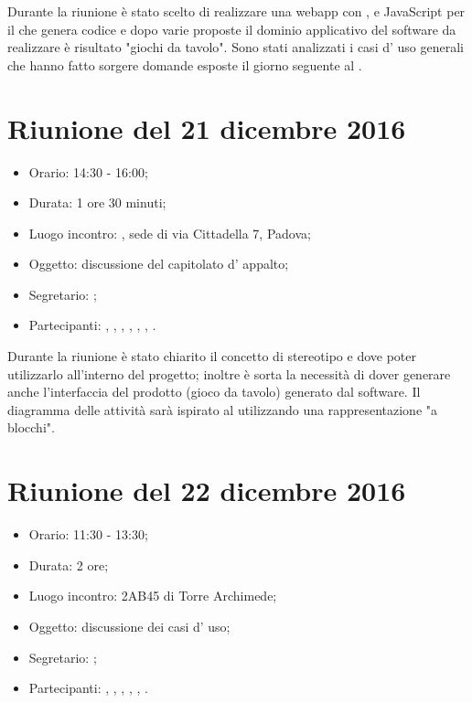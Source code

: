 Durante la riunione è stato scelto di realizzare una webapp con , e JavaScript per il  che genera codice  e dopo varie proposte il dominio applicativo del software da realizzare è risultato "giochi da tavolo". 
Sono stati analizzati i casi d' uso generali che hanno fatto sorgere domande esposte il giorno seguente al \GP.



\section{Riunione del 21 dicembre 2016}

\begin{itemize}
	\item Orario: 14:30 - 16:00;
	\item Durata: 1 ore 30 minuti;
	\item Luogo incontro: \ZU, sede di via Cittadella 7, Padova; 
	\item Oggetto: discussione del capitolato d' appalto;
	\item Segretario: \AZ; 
	\item Partecipanti: \GP, \AZ, \GG, \LB, \LS, \MM, \PB.
\end{itemize}

Durante la riunione è stato chiarito il concetto di stereotipo e dove poter utilizzarlo all'interno del progetto; inoltre è sorta la necessità di dover generare anche l'interfaccia del prodotto (gioco da tavolo) generato dal software. Il diagramma delle attività sarà ispirato al  utilizzando una rappresentazione "a blocchi".



\section{Riunione del 22 dicembre 2016}

\begin{itemize}
	\item Orario: 11:30 - 13:30;
	\item Durata: 2 ore;
	\item Luogo incontro: 2AB45 di Torre Archimede; 
	\item Oggetto: discussione dei casi d' uso;
	\item Segretario: \PB; 
	\item Partecipanti: \AZ, \GG, \LB, \LS, \MM, \PB.
\end{itemize}


